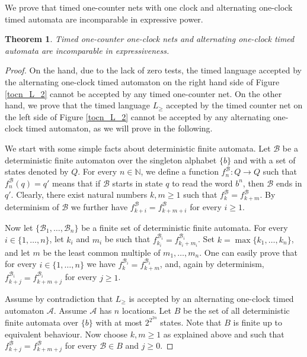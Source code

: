 \documentclass{CSML}
\theoremstyle{plain}\newtheorem{theorem}[thm]{Theorem}
\theoremstyle{plain}\newtheorem{corollary}[thm]{Corollary}
\theoremstyle{plain}\newtheorem{example}[thm]{Example}
\theoremstyle{plain}\newtheorem{lemma}[thm]{Lemma}
\theoremstyle{plain}\newtheorem{remark}[thm]{Remark}
\newcommand{\N}{\mathbb{N}}
\newcommand{\B}{\mathcal{B}}
\newcommand{\A}{\mathcal{A}}
\begin{document}
We prove that timed one-counter nets with one clock and alternating one-clock timed automata are incomparable in expressive power. 
\begin{theorem}
	Timed one-counter one-clock nets and alternating one-clock timed automata are incomparable in expressiveness.
\end{theorem}
\begin{proof}
	On the hand, due to the lack of zero tests, 
	the timed language accepted by the alternating one-clock timed automaton on the right hand side of Figure \ref{tocn_L_2} cannot be accepted by any timed one-counter net. 
	On the other hand, 
	we prove that the timed language $L_{\geq}$ accepted by the timed counter net on the left side of Figure \ref{tocn_L_2} cannot be accepted by any alternating one-clock timed automaton, as we will prove in the following. 
	
	
	We start with some simple facts about deterministic finite automata. 	
	Let $\B$ be a deterministic finite automaton over the singleton alphabet $\{b\}$ and with a set of states denoted by $Q$. 
	For every $n\in\N$, 
	we define a function $f^\B_n:Q\to Q$ such that $f^\B_n(q)=q'$ means that if $\B$ starts in state $q$ to read the word $b^n$, then $\B$ ends in $q'$. 
	Clearly, there exist natural numbers $k,m \ge 1$ such that $f^\B_{k}=f^\B_{k+m}$. 
	By determinism of $\B$ we further have $f^\B_{k+i}=f^\B_{k+m+i}$ for every $i\ge 1$. 
	
	Now let $\{\B_1,\dots,\B_n\}$ be a finite set of deterministic finite automata. 
	For every $i\in\{1,\dots,n\}$, let $k_{i}$ and $m_{i}$ be such that $f^{\B_i}_{k_i}=f^{\B_i}_{k_i+m_i}$. 
	Set $k=\max\{k_1,\dots,k_n\}$, and let $m$ be the least common multiple of $m_1,\dots,m_n$. 
	One can easily prove that for every $i\in\{1,\dots,n\}$ we have $f^{\B_i}_k = f^{\B_i}_{k+m}$, and, again by determinism, 
	$f^{\B_i}_{k+j} = f^{\B_i}_{k+m+j}$ for every $j\geq 1$. 
	
	
	
	
	
	
	
	
	
	
	Assume by contradiction that $L_{\geq}$ is accepted by an alternating  one-clock timed automaton $\A$.
	Assume $\A$ has $n$ locations.
	Let $B$ be the set of all deterministic finite automata over $\{b\}$ with at most $2^{2^{2n}}$ states. Note that $B$ is finite up to equivalent behaviour. 
	Now choose $k,m \ge 1$ as explained above and such that 
	$f^\B_{k+j}=f^\B_{k+m+j}$ for every $\B\in B$ and $j\ge 0$. 
	

\end{proof}
\end{document}
